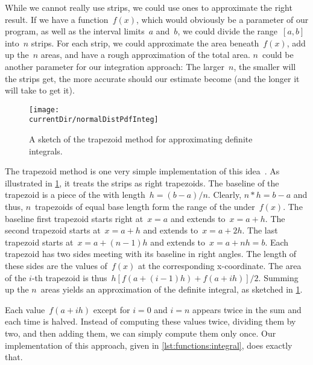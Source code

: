 While we cannot really use  strips, we could use  ones to approximate the right result.
If we have a function~$f(x)$, which would obviously be a parameter of our program, as well as the interval limits~$a$ and~$b$, we could divide the range~$[a,b]$ into~$n$ strips.
For each strip, we could approximate the area beneath~$f(x)$, add up the~$n$ areas, and have a rough approximation of the total area.
$n$~could be another parameter for our integration approach:
The larger~$n$, the smaller will the strips get, the more accurate should our estimate become (and the longer it will take to get it).%
%
\begin{figure}%
\centering%
\texttt{[image: \\currentDir/normalDistPdfInteg]}%
\caption{A sketch of the trapezoid method for approximating definite integrals.}%
\label{fig:normalDistPdfInteg}%
\end{figure}%
%
%

The trapezoid method is one very simple implementation of this idea~\cite{E2013AITNMAA}.
As illustrated in \cref{fig:normalDistPdfInteg}, it treats the strips as right trapezoids.
The baseline of the trapezoid is a piece of the  with length~$h=(b-a)/n$.
Clearly, $n*h=b-a$ and thus, $n$~trapezoids of equal base length form the range of the  under~$f(x)$.
The baseline first trapezoid starts right at~$x=a$ and extends to~$x=a+h$.
The second trapezoid starts at~$x=a+h$ and extends to~$x=a+2h$.
The last trapezoid starts at~$x=a+(n-1)h$ and extends to~$x=a+nh=b$.
Each trapezoid has two sides meeting with its baseline in right angles.
The length of these sides are the values of~$f(x)$ at the corresponding x\nobreakdashes-coordinate.
The area of the $i$\nobreakdashes-th trapezoid is thus~$h[f(a+(i-1)h)+f(a+ih)]/2$.
Summing up the $n$~areas yields an approximation of the definite integral, as sketched in \cref{fig:normalDistPdfInteg}.

Each value~$f(a+ih)$ except for $i=0$ and $i=n$ appears twice in the sum and each time is halved.
Instead of computing these values twice, dividing them by two, and then adding them, we can simply compute them only once.
Our implementation  of this approach, given in \cref{lst:functions:integral}, does exactly that.

